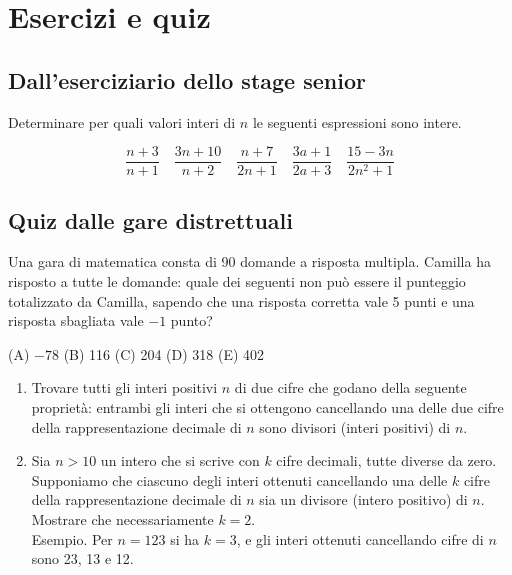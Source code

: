 \chapter{Esercizi e quiz}
\label{ch:quiz}

\section{Dall'eserciziario dello stage senior}
\label{sec:quiz_stage_senior}

\begin{esercizio}
    \label{ex:stage_senior_41}
    Determinare per quali valori interi di $n$ le seguenti espressioni sono intere.

    \begin{equation*}
        \dfrac{n + 3}{n + 1} \quad \dfrac{3n + 10}{n + 2} \quad \dfrac{n + 7}{2n + 1} \quad \dfrac{3a + 1}{2a + 3} \quad
        \dfrac{15 - 3n}{2n^2 + 1}
    \end{equation*}
\end{esercizio}

\section{Quiz dalle gare distrettuali}
\label{sec:quiz_gare_distrettuali}

\begin{esercizio}
    \label{ex:distrettuali_2018_1}
    Una gara di matematica consta di 90 domande a risposta multipla.
    Camilla ha risposto a tutte le domande: quale dei seguenti non può essere il punteggio totalizzato da Camilla,
    sapendo che una risposta corretta vale 5 punti e una risposta sbagliata vale $-1$ punto?

    (A) $-78$ \quad (B) 116 \quad (C) 204 \quad (D) 318 \quad (E) 402
\end{esercizio}

\begin{esercizio}
    \label{ex:distrettuali_2018_15}
    \begin{enumerate}
        \item Trovare tutti gli interi positivi $n$ di due cifre che godano della seguente proprietà: entrambi
        gli interi che si ottengono cancellando una delle due cifre della rappresentazione decimale
        di $n$ sono divisori (interi positivi) di $n$.
        \item Sia $n > 10$ un intero che si scrive con $k$ cifre decimali, tutte diverse da zero.
        Supponiamo che ciascuno degli interi ottenuti cancellando una delle $k$ cifre della rappresentazione decimale
        di $n$ sia un divisore (intero positivo) di $n$.
        Mostrare che necessariamente $k = 2$. \\
        Esempio.
        Per $n = 123$ si ha $k = 3$, e gli interi ottenuti cancellando cifre di $n$ sono 23, 13 e 12.
    \end{enumerate}
\end{esercizio}

